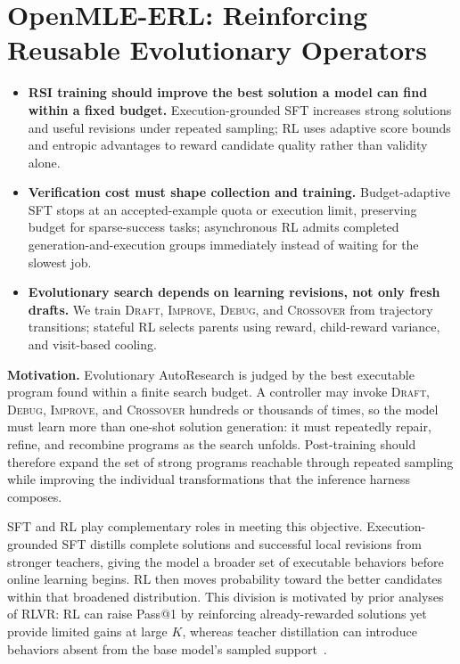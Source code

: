 \section{OpenMLE-ERL: Reinforcing Reusable Evolutionary Operators}

\begin{takeaway}
    \begin{itemize}[leftmargin=*,itemsep=1pt,topsep=2pt,partopsep=0pt,parsep=0pt]
    \item \textbf{RSI training should improve the best solution a model can find within a fixed budget.} 
    Execution-grounded SFT increases strong solutions and useful revisions under repeated sampling; RL uses adaptive score bounds and entropic advantages to reward candidate quality rather than validity alone.
    \item \textbf{Verification cost must shape collection and training.} Budget-adaptive SFT stops at an accepted-example quota or execution limit, preserving budget for sparse-success tasks; asynchronous RL admits completed generation-and-execution groups immediately instead of waiting for the slowest job.
    \item \textbf{Evolutionary search depends on learning revisions, not only fresh drafts.} 
    We train \textsc{Draft}, \textsc{Improve}, \textsc{Debug}, and \textsc{Crossover} from trajectory transitions; stateful RL selects parents using reward, child-reward variance, and visit-based cooling.
    \end{itemize}
\end{takeaway}

\textbf{Motivation.}
Evolutionary AutoResearch is judged by the best executable program found within a finite search budget. A controller may invoke \textsc{Draft}, \textsc{Debug}, \textsc{Improve}, and \textsc{Crossover} hundreds or thousands of times, so the model must learn more than one-shot solution generation: it must repeatedly repair, refine, and recombine programs as the search unfolds. Post-training should therefore expand the set of strong programs reachable through repeated sampling while improving the individual transformations that the inference harness composes.


SFT and RL play complementary roles in meeting this objective. Execution-grounded SFT distills complete solutions and successful local revisions from stronger teachers, giving the model a broader set of executable behaviors before online learning begins. RL then moves probability toward the better candidates within that broadened distribution. This division is motivated by prior analyses of RLVR: RL can raise Pass@1 by reinforcing already-rewarded solutions yet provide limited gains at large $K$, whereas teacher distillation can introduce behaviors absent from the base model's sampled support~\citep{yue2025doesrl}.

